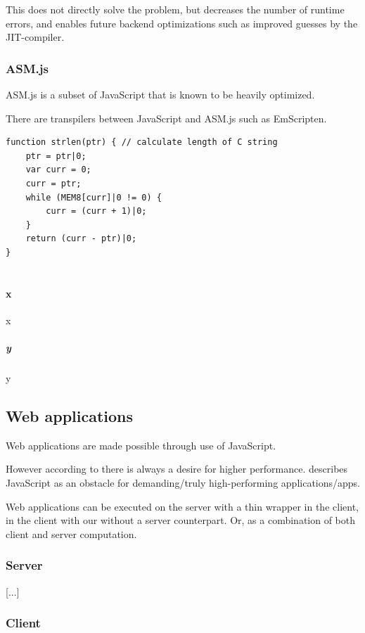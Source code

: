 This does not directly solve the problem, but decreases the number of runtime errors, and enables future backend optimizations such as improved guesses by the JIT-compiler.

\subsubsection{ASM.js}

ASM.js is a subset of JavaScript that is known to be heavily optimized.

There are transpilers between JavaScript and ASM.js such as EmScripten.

\begin{verbatim}
function strlen(ptr) { // calculate length of C string
    ptr = ptr|0;
    var curr = 0;
    curr = ptr;
    while (MEM8[curr]|0 != 0) {
        curr = (curr + 1)|0;
    }
    return (curr - ptr)|0;
}
    
\end{verbatim}

\paragraph{x}

x

\subparagraph{y}

y

\subsection*{Web applications}

Web applications are made possible through use of JavaScript.

However according to \textcite{ReiserBlaser2017} there is always a desire for higher performance. \textcite{Zakai2018} describes JavaScript as an obstacle for demanding/truly high-performing applications/apps.

Web applications can be executed on the server with a thin wrapper in the client, in the client with our without a server counterpart. Or, as a combination of both client and server computation.

\subsubsection{Server}

[...]

\subsubsection{Client}

